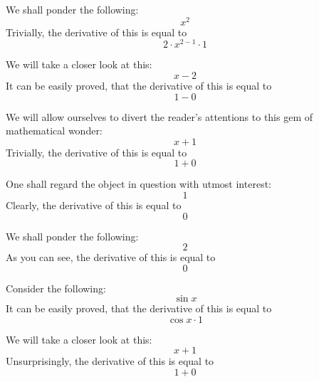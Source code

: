\documentclass{article}
\begin{document}
We shall ponder the following:
\begin{equation}
x ^{2 } 
\end{equation}
Trivially, the derivative of this is equal to
\begin{equation}
2 \cdot x ^{2 - 1 } \cdot 1 
\end{equation}

We will take a closer look at this:
\begin{equation}
x - 2 
\end{equation}
It can be easily proved, that the derivative of this is equal to
\begin{equation}
1 - 0 
\end{equation}

We will allow ourselves to divert the reader's attentions to this gem of mathematical wonder:
\begin{equation}
x + 1 
\end{equation}
Trivially, the derivative of this is equal to
\begin{equation}
1 + 0 
\end{equation}

One shall regard the object in question with utmost interest:
\begin{equation}
1 
\end{equation}
Clearly, the derivative of this is equal to
\begin{equation}
0 
\end{equation}

We shall ponder the following:
\begin{equation}
2 
\end{equation}
As you can see, the derivative of this is equal to
\begin{equation}
0 
\end{equation}

Consider the following:
\begin{equation}
\sin x 
\end{equation}
It can be easily proved, that the derivative of this is equal to
\begin{equation}
\cos x \cdot 1 
\end{equation}

We will take a closer look at this:
\begin{equation}
x + 1 
\end{equation}
Unsurprisingly, the derivative of this is equal to
\begin{equation}
1 + 0 
\end{equation}
\end{document}
